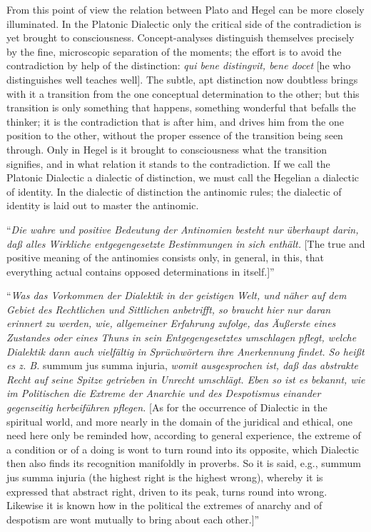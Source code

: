 \documentclass[12pt]{book}
\begin{document}
From this point of view the relation between Plato and Hegel can be more closely illuminated. In the
Platonic Dialectic only the critical side of the contradiction is yet brought to consciousness.
Concept-analyses distinguish themselves precisely by the fine, microscopic separation of the
moments; the effort is to avoid the contradiction by help of the distinction: \textit{qui bene
distingvit, bene docet} [he who distinguishes well teaches well]. The subtle, apt distinction now
doubtless brings with it a transition from the one conceptual determination to the other; but this
transition is only something that happens, something wonderful that befalls the thinker; it is the
contradiction that is after him, and drives him from the one position to the other, without the
proper essence of the transition being seen through. Only in Hegel is it brought to consciousness
what the transition signifies, and in what relation it stands to the contradiction. If we call the
Platonic Dialectic a dialectic of distinction, we must call the Hegelian a dialectic of identity. In
the dialectic of distinction the antinomic rules; the dialectic of identity is laid out to master
the antinomic.

``\textit{Die wahre und positive Bedeutung der Antinomien besteht nur überhaupt darin, daß alles
Wirkliche entgegengesetzte Bestimmungen in sich enthält.} [The true and positive meaning of the
antinomies consists only, in general, in this, that everything actual contains opposed determinations
in itself.]''

``\textit{Was das Vorkommen der Dialektik in der geistigen Welt, und näher auf dem Gebiet des
Rechtlichen und Sittlichen anbetrifft, so braucht hier nur daran erinnert zu werden, wie, allgemeiner
Erfahrung zufolge, das Äußerste eines Zustandes oder eines Thuns in sein Entgegengesetztes umschlagen
pflegt, welche Dialektik dann auch vielfältig in Sprüchwörtern ihre Anerkennung findet. So heißt es
z. B.} summum jus summa injuria, \textit{womit ausgesprochen ist, daß das abstrakte Recht auf seine
Spitze getrieben in Unrecht umschlägt. Eben so ist es bekannt, wie im Politischen die Extreme der
Anarchie und des Despotismus einander gegenseitig herbeiführen pflegen.} [As for the occurrence of
Dialectic in the spiritual world, and more nearly in the domain of the juridical and ethical, one need
here only be reminded how, according to general experience, the extreme of a condition or of a doing
is wont to turn round into its opposite, which Dialectic then also finds its recognition manifoldly in
proverbs. So it is said, e.g., summum jus summa injuria (the highest right is the highest wrong),
whereby it is expressed that abstract right, driven to its peak, turns round into wrong. Likewise it
is known how in the political the extremes of anarchy and of despotism are wont mutually to bring
about each other.]''
\end{document}
